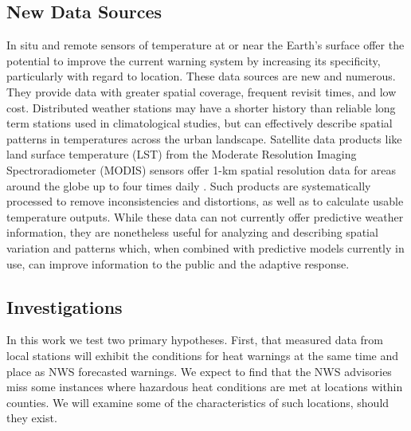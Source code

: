 \documentclass{ametsoc}
\begin{document}
\subsection{New Data Sources} \label{subsec:newDataSources}
In situ and remote sensors of temperature at or near the Earth's surface offer the potential to improve the current warning system by increasing its specificity, particularly with regard to location. These data sources are new and numerous. They provide data with greater spatial coverage, frequent revisit times, and low cost. Distributed weather stations may have a shorter history than reliable long term stations used in climatological studies, but can effectively describe spatial patterns in temperatures across the urban landscape. Satellite data products like land surface temperature (LST) from the Moderate Resolution Imaging Spectroradiometer (MODIS) sensors offer 1-km spatial resolution data for areas around the globe up to four times daily \citep{huang2008}. Such products are systematically processed to remove inconsistencies and distortions, as well as to calculate usable temperature outputs. While these data can not currently offer predictive weather information, they are nonetheless useful for analyzing and describing spatial variation and patterns which, when combined with predictive models currently in use, can improve information to the public and the adaptive response.


\subsection{Investigations} \label{subsec:hypotheses}
In this work we test two primary hypotheses. First, that measured data from local stations will exhibit the conditions for heat warnings at the same time and place as NWS forecasted warnings. We expect to find that the NWS advisories miss some instances where hazardous heat conditions are met at locations within counties. We will examine some of the characteristics of such locations, should they exist. 
\end{document}
